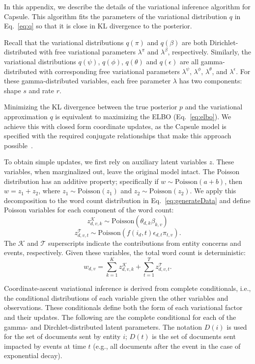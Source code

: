 
In this appendix, we describe the details of the variational inference algorithm for Capsule. This algorithm fits the parameters of the variational distribution $q$ in Eq.~\ref{eq:q} so that it is close in KL divergence to the posterior.

Recall that the variational distributions $q(\pi)$ and $q(\beta)$ are both Dirichlet-distributed with free variational parameters $\lambda^\pi$ and $\lambda^\beta$, respectively.  Similarly, the variational distributions $q(\psi)$, $q(\phi)$, $q(\theta)$ and $q(\epsilon)$ are all gamma-distributed with corresponding free variational parameters $\lambda^\psi$, $\lambda^\phi$, $\lambda^\theta$, and $\lambda^\epsilon$.  For these gamma-distributed variables, each free parameter $\lambda$ has two components: shape $s$ and rate $r$.

Minimizing the KL divergence between the true posterior $p$ and the variational approximation $q$ is equivalent to maximizing the ELBO (Eq.~\ref{eq:elbo}).  We achieve this with closed form coordinate updates, as the Capsule model is specified with the required conjugate relationships that make this approach possible~\cite{Ghahramani:2001}.

To obtain simple updates, we first rely on auxiliary latent variables $z$. These variables, when marginalized out, leave the original model intact. The Poisson distribution has an additive property; specifically if $w \sim \mbox{Poisson}(a+b)$, then $w = z_1 + z_2$, where $z_1 \sim \mbox{Poisson}(z_1)$ and $z_2 \sim \mbox{Poisson}(z_2)$.  We apply this decomposition to the word count distribution in Eq.~\ref{eq:generateData} and define Poisson variables for each component of the word count:
\[ z^\mathcal{K}_{d,v,k} \sim \mbox{Poisson}(\theta_{d,k}\beta_{k,v}) \]
\[ z^\mathcal{T}_{d,v,t} \sim \mbox{Poisson}\left(f(i_d, t) \epsilon_{d,t} \pi_{t,v}\right). \]
The $\mathcal{K}$ and $\mathcal{T}$ superscripts indicate the contributions from entity concerns and events, respectively.  Given these variables, the total word count is deterministic:
\[ w_{d,v} = \sum_{k=1}^K z^\mathcal{K}_{d,v,k} + \sum_{t=1}^T z^\mathcal{T}_{d,v,t}. \]

Coordinate-ascent variational inference is derived from complete conditionals, i.e., the conditional distributions of each variable given the other variables and observations. These conditionals define both the form of each variational factor and their updates. The following are the complete conditional for each of the gamma- and Dirchlet-distributed latent parameters.  The notation $D(i)$ is used for the set of documents sent by entity $i$; $D(t)$ is the set of documents sent impacted by events at time $t$ (e.g., all documents after the event in the case of exponential decay).

